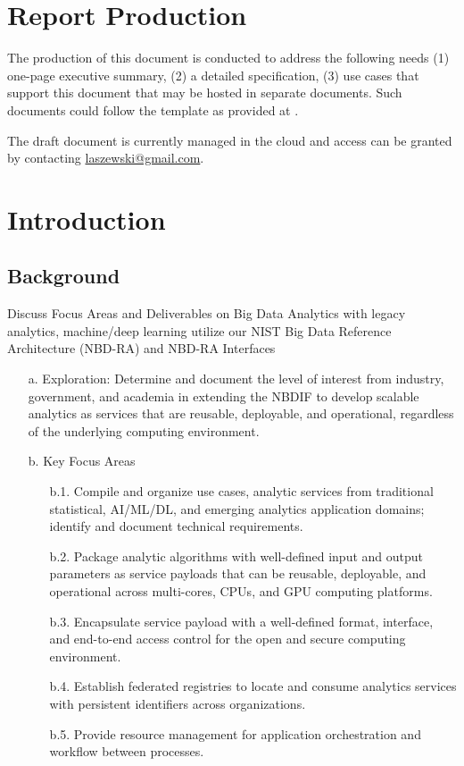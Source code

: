 \section*{Report Production}

The production of this document is conducted to address the following needs (1) one-page executive summary, (2) a detailed specification, (3) use cases that support this document that may be hosted in separate documents. Such documents could follow the template as provided at  \cite{nist-bigdatawg}.

The draft document is currently managed in the cloud and access can be granted by contacting \url{laszewski@gmail.com}.

\section{Introduction}

\subsection{Background}

Discuss Focus Areas and Deliverables on Big Data Analytics with legacy analytics, machine/deep learning utilize our NIST Big Data Reference Architecture (NBD-RA) and NBD-RA Interfaces

\begin{enumerate}
\item[a.]	Exploration: Determine and document the level of 
  interest from industry, government, and academia in extending the NBDIF to develop scalable analytics as services that are reusable, deployable, and operational, regardless of the underlying computing environment.

\item[b.] Key Focus Areas

  \begin{enumerate}
  \item[b.1.] Compile and organize use cases, analytic services  
     from traditional statistical, AI/ML/DL, and emerging analytics application domains; identify and document technical requirements.
  \item[b.2.] Package analytic algorithms with well-defined input 
     and output parameters as service payloads that can be reusable, deployable, and operational across multi-cores, CPUs, and GPU computing platforms.
  \item[b.3.] Encapsulate service payload with a well-defined 
     format, interface, and end-to-end access control for the open and secure computing environment. 
  \item[b.4.] Establish federated registries to locate and 
     consume analytics services with persistent identifiers across organizations. 
  \item[b.5.] Provide resource management for application   
     orchestration and workflow between processes.
  \end{enumerate}
  
\end{enumerate}

